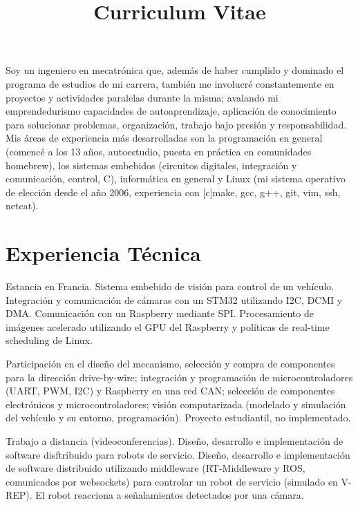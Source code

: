 \documentclass[11pt,a4paper,sans]{moderncv}	%
\title{Curriculum Vitae}
\begin{document}
\maketitle
Soy un ingeniero en mecatrónica que, además de haber cumplido y dominado el programa de estudios de mi carrera, también me involucré constantemente en proyectos y actividades paralelas durante la misma; avalando mi emprendedurismo capacidades de autoaprendizaje, aplicación de conocimiento para solucionar problemas, organización, trabajo bajo presión y responsabilidad. Mis áreas de experiencia más desarrolladas son la programación en general (comencé a los 13 años, autoestudio, puesta en práctica en comunidades homebrew), los sistemas embebidos (circuitos digitales, integración y comunicación, control, C), informática en general y Linux (mi sistema operativo de elección desde el año 2006, experiencia con [c]make, gcc, g++, git, vim, ssh, netcat).

\section{Experiencia Técnica}
{Estancia en Francia. Sistema embebido de visión para control de un vehículo. Integración y comunicación de cámaras con un STM32 utilizando I2C, DCMI y DMA. Comunicación con un Raspberry mediante SPI. Procesamiento de imágenes acelerado utilizando el GPU del Raspberry y políticas de real-time scheduling de Linux.}

{Participación en el diseño del mecanismo, selección y compra de componentes para la dirección drive-by-wire; integración y programación de microcontroladores (UART, PWM, I2C) y Raspberry en una red CAN; selección de componentes electrónicos y microcontroladores; visión computarizada (modelado y simulación del vehículo y su entorno, programación). Proyecto estudiantil, no implementado.}

{Trabajo a distancia (videoconferencias). Diseño, desarrollo e implementación de software disftribuido para robots de servicio. Diseño, desarrollo e implementación de software distribuido utilizando middleware (RT-Middleware y ROS, comunicados por websockets) para controlar un robot de servicio (simulado en V-REP). El robot reacciona a señalamientos detectados por una cámara.}
\end{document}
